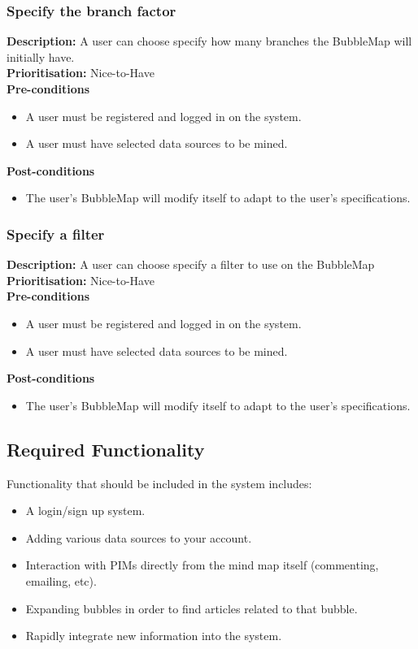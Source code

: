 \documentclass[hidelinks,english]{article}
\begin{document}
    		\subsubsection{Specify the branch factor}
				\textbf{Description:}  A user can choose specify how many branches the BubbleMap will initially have.
				\\
			    \textbf{Prioritisation:} Nice-to-Have\\
      			\textbf{Pre-conditions}
			    \begin{itemize}
			        \item A user must be registered and logged in on the system.
			        \item A user must have selected data sources to be mined.
			    \end{itemize}
    			\textbf{Post-conditions}
			    \begin{itemize}
			    	\item The user's BubbleMap will modify itself to adapt to the user's specifications.
    			\end{itemize}
    		\subsubsection{Specify a filter}
				\textbf{Description:}  A user can choose specify a filter to use on the BubbleMap
				\\
			    \textbf{Prioritisation:} Nice-to-Have\\
    			\textbf{Pre-conditions}
			    \begin{itemize}
			        \item A user must be registered and logged in on the system.
			        \item A user must have selected data sources to be mined.
			    \end{itemize}
    			\textbf{Post-conditions}
     			\begin{itemize}
        			\item The user's BubbleMap will modify itself to adapt to the user's specifications.
    			\end{itemize}
		\subsection{Required Functionality}
			Functionality that should be included in the system includes:
			\begin{itemize}
			\item A login/sign up system. 
			\item Adding various data sources to your account.
			\item Interaction with PIMs directly from the mind map itself (commenting, emailing, etc).
			\item Expanding bubbles in order to find articles related to that bubble.
			\item Rapidly integrate new information into the system.
			\end{itemize}
			
\end{document}
